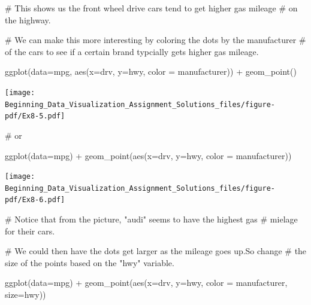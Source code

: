 \documentclass[
  letterpaper,
  DIV=11,
  numbers=noendperiod]{scrreprt}
\newenvironment{Shaded}{\begin{snugshade}}{\end{snugshade}}
\newcommand{\AttributeTok}[1]{\textcolor[rgb]{0.40,0.45,0.13}{#1}}
\newcommand{\CommentTok}[1]{\textcolor[rgb]{0.37,0.37,0.37}{#1}}
\newcommand{\FunctionTok}[1]{\textcolor[rgb]{0.28,0.35,0.67}{#1}}
\newcommand{\NormalTok}[1]{\textcolor[rgb]{0.00,0.23,0.31}{#1}}
\newcommand{\SpecialCharTok}[1]{\textcolor[rgb]{0.37,0.37,0.37}{#1}}
\begin{document}
\begin{Shaded}
\begin{Highlighting}[]
\CommentTok{\# This shows us the front wheel drive cars tend to get higher gas mileage}
\CommentTok{\# on the highway. }

\CommentTok{\# We can make this more interesting by coloring the dots by the manufacturer}
\CommentTok{\# of the cars to see if a certain brand typcially gets higher gas mileage.}

\FunctionTok{ggplot}\NormalTok{(}\AttributeTok{data=}\NormalTok{mpg, }\FunctionTok{aes}\NormalTok{(}\AttributeTok{x=}\NormalTok{drv, }\AttributeTok{y=}\NormalTok{hwy, }\AttributeTok{color =}\NormalTok{ manufacturer)) }\SpecialCharTok{+}
  \FunctionTok{geom\_point}\NormalTok{()}
\end{Highlighting}
\end{Shaded}

\texttt{[image: Beginning\_Data\_Visualization\_Assignment\_Solutions\_files/figure-pdf/Ex8-5.pdf]}

\begin{Shaded}
\begin{Highlighting}[]
\CommentTok{\# or}

\FunctionTok{ggplot}\NormalTok{(}\AttributeTok{data=}\NormalTok{mpg) }\SpecialCharTok{+}
  \FunctionTok{geom\_point}\NormalTok{(}\FunctionTok{aes}\NormalTok{(}\AttributeTok{x=}\NormalTok{drv, }\AttributeTok{y=}\NormalTok{hwy, }\AttributeTok{color =}\NormalTok{ manufacturer))}
\end{Highlighting}
\end{Shaded}

\texttt{[image: Beginning\_Data\_Visualization\_Assignment\_Solutions\_files/figure-pdf/Ex8-6.pdf]}

\begin{Shaded}
\begin{Highlighting}[]
\CommentTok{\# Notice that from the picture, "audi" seems to have the highest gas}
\CommentTok{\# mielage for their cars.}

\CommentTok{\# We could then have the dots get larger as the mileage goes up.So change }
\CommentTok{\# the size of the points based on the "hwy" variable.}

\FunctionTok{ggplot}\NormalTok{(}\AttributeTok{data=}\NormalTok{mpg) }\SpecialCharTok{+}
  \FunctionTok{geom\_point}\NormalTok{(}\FunctionTok{aes}\NormalTok{(}\AttributeTok{x=}\NormalTok{drv, }\AttributeTok{y=}\NormalTok{hwy, }\AttributeTok{color =}\NormalTok{ manufacturer, }\AttributeTok{size=}\NormalTok{hwy))}
\end{Highlighting}
\end{Shaded}
\end{document}
